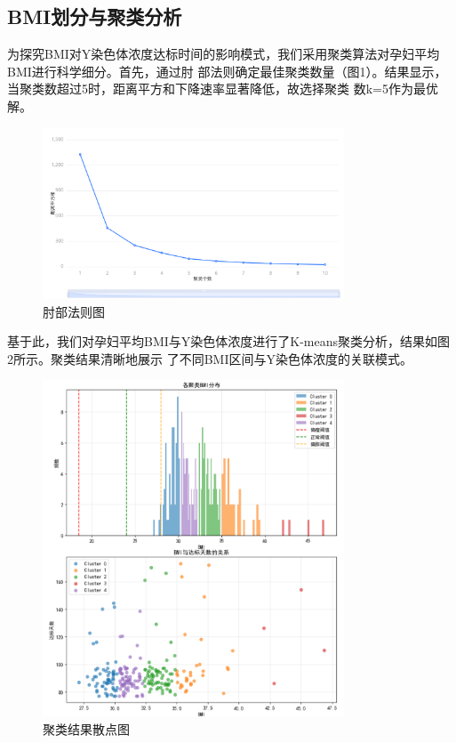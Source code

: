\documentclass{article}
\begin{document}
\subsection{\textbf{BMI划分与聚类分析}}
为探究BMI对Y染色体浓度达标时间的影响模式，我们采用聚类算法对孕妇平均BMI进行科学细分。首先，通过肘
部法则确定最佳聚类数量（图1）。结果显示，当聚类数超过5时，距离平方和下降速率显著降低，故选择聚类
数k=5作为最优解。
\begin{figure}[H]  %
    \centering  %
    \includegraphics[width=0.8\textwidth]{graph/zhoubu.png}  %
    \caption{肘部法则图}  %
    \label{fig:single}  %
\end{figure}

基于此，我们对孕妇平均BMI与Y染色体浓度进行了K-means聚类分析，结果如图2所示。聚类结果清晰地展示
了不同BMI区间与Y染色体浓度的关联模式。
\begin{figure}[H]  %
    \centering  %
    \includegraphics[width=0.8\textwidth]{graph/julei1.png}  %
    \caption{聚类结果散点图}  %
    \label{fig:single}  %
\end{figure}
\end{document}

